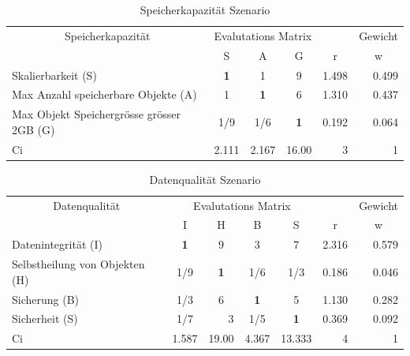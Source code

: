 \begin{table}[htbp]
\caption{Speicherkapazität Szenario}
\begin{tabular}{|p{7.1cm}|c|c|c|r|r|}
\hline
\multicolumn{ 1}{|c|}{Speicherkapazität } & \multicolumn{ 3}{c|}{Evalutations Matrix} & \multicolumn{1}{l|}{} & \multicolumn{1}{l|}{Gewicht} \\ \cline{ 2- 6}
\multicolumn{ 1}{|c|}{} & S & A & G & \multicolumn{1}{c|}{r} & \multicolumn{1}{c|}{w} \\ \hline
Skalierbarkeit (S) & \textbf{1} & 1 & 9 & 1.498 & 0.499 \\ \hline
Max Anzahl speicherbare Objekte (A) & 1 & \textbf{1} & 6 & 1.310 & 0.437 \\ \hline
Max Objekt Speichergrösse grösser 2GB (G) &  1/9 &  1/6 & \textbf{1} & 0.192 & 0.064 \\ \hline \hline
Ci & \multicolumn{1}{r|}{2.111} & \multicolumn{1}{r|}{2.167} & \multicolumn{1}{r|}{16.00} & 3 & 1 \\ \hline
\end{tabular}
\label{AHPSpeicherkapazitätS}
\end{table}


\begin{table}[htbp]
\caption{Datenqualität Szenario}
\begin{tabular}{|l|c|c|c|c|r|r|}
\hline
\multicolumn{ 1}{|c|}{Datenqualität} & \multicolumn{ 4}{c|}{Evalutations Matrix} & \multicolumn{1}{l|}{} & \multicolumn{1}{l|}{Gewicht} \\ \cline{ 2- 7}
\multicolumn{ 1}{|c|}{} & I & H & B & S & \multicolumn{1}{c|}{r} & \multicolumn{1}{c|}{w} \\ \hline
Datenintegrität (I) & \textbf{1} & 9 & 3 & 7 & 2.316 & 0.579 \\ \hline
Selbstheilung von Objekten (H) &  1/9 & \textbf{1} &  1/6 &  1/3 & 0.186 & 0.046 \\ \hline
Sicherung (B) &  1/3 & 6 & \textbf{1} & 5 & 1.130 & 0.282 \\ \hline
Sicherheit (S) &  1/7 & \multicolumn{1}{r|}{3    } &  1/5 & \textbf{1} & 0.369 & 0.092 \\ \hline  \hline
Ci & \multicolumn{1}{r|}{1.587} & \multicolumn{1}{r|}{19.00} & \multicolumn{1}{r|}{4.367} & \multicolumn{1}{r|}{13.333} & 4 & 1 \\ \hline
\end{tabular}
\label{AHPDatenqualitätS}
\end{table}


